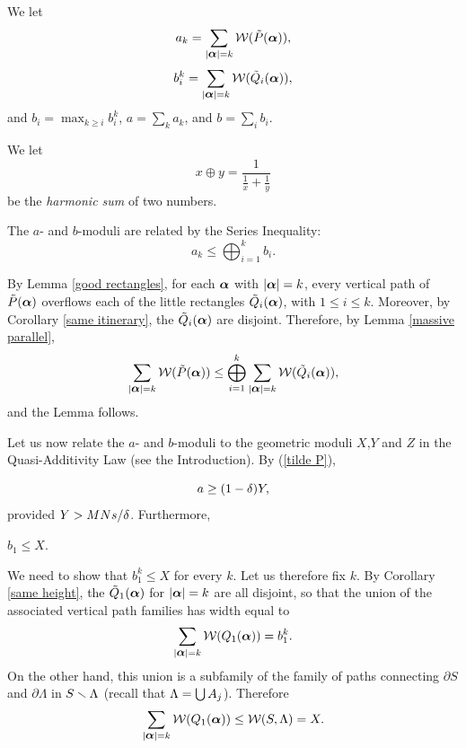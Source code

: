 We let 
$$
a_k = \sum_{|{\mbox{\small\boldmath$\alpha$} }|=k} {\cal W}(\tilde P({\mbox{\boldmath$\alpha$} })),
$$
%
$$
b_i^k = \sum_{|{\mbox{\small\boldmath$\alpha$} }|=k} {\cal W}(\tilde Q_i({\mbox{\boldmath$\alpha$} })),
$$
and $b_i = \max_{k \ge i} b_i^k$, $a = \sum_k a_k$, and $b = \sum_i b_i$.

We let 
$$ 
        x\oplus y=\frac{1}{\frac{1}{x}+ \frac{1}{y}} 
$$
be the {\it harmonic sum} of two numbers.



\begin{lem}\label{oplus}
The $a$- and $b$-moduli are related by the Series Inequality:
$$ 
       a_k \leq  \bigoplus_{i=1}^k  b_i.
$$  
\end{lem}
%
\begin{pf}
By Lemma \ref{good rectangles}, 
for each ${\mbox{\boldmath$\alpha$} }$ with $|{\mbox{\boldmath$\alpha$} }| = k$,
every vertical path of $\tilde P({\mbox{\boldmath$\alpha$} })$ overflows each of  the little rectangles $\tilde Q_i({\mbox{\boldmath$\alpha$} })$, 
with $1\le i \le k$. 
Moreover, by Corollary \ref{same itinerary}, the $\tilde Q_i({\mbox{\boldmath$\alpha$} })$ are disjoint. 
Therefore,
by Lemma \ref{massive parallel},
$$
\sum_{|{\mbox{\small\boldmath$\alpha$} }|= k} {\cal W}(\tilde P({\mbox{\boldmath$\alpha$} })) \le \bigoplus_{i=1}^k \sum_{|{\mbox{\small\boldmath$\alpha$} }|=k} {\cal W}(\tilde Q_i({\mbox{\boldmath$\alpha$} })),
$$
and the Lemma follows.
\end{pf}

Let us now relate the $a$- and  $b$-moduli to the geometric moduli $X$,$Y$ and $Z$
in the Quasi-Additivity Law (see the Introduction). By  (\ref{tilde P}), 

\begin{equation}\label{a-moduli}
     a \geq (1-{\delta}) Y,
\end{equation} 
provided $Y>MNs/{\delta}$.
Furthermore,

\begin{lem}\label{b1-estimate}
    $ b_1  \leq X$. 
\end{lem}
%
\begin{pf}
We need to show that $b_1^k \leq X$ for every $k$.
Let us therefore fix $k$. 
By Corollary \ref{same height},
the $\tilde Q_1({\mbox{\boldmath$\alpha$} })$ for $|{\mbox{\boldmath$\alpha$} }| = k$ are all disjoint,
so that the union of the associated vertical path families has width
 equal to 
$$
    \sum_{|{\mbox{\small\boldmath$\alpha$} }| = k} {\cal W}(Q_1({\mbox{\boldmath$\alpha$} })) = b_1^k.
$$
On the other hand, 
this union is a subfamily of the family of paths connecting 
$\partial S$ and $\partial \Lambda$ in $S \smallsetminus \Lambda$ (recall that ${\Lambda}=\bigcup A_j$).
Therefore 
$$
    \sum_{|{\mbox{\small\boldmath$\alpha$} }| = k} {\cal W}(Q_1({\mbox{\boldmath$\alpha$} })) \le {\cal W}(S, \Lambda) = X.
$$
\end{pf}

